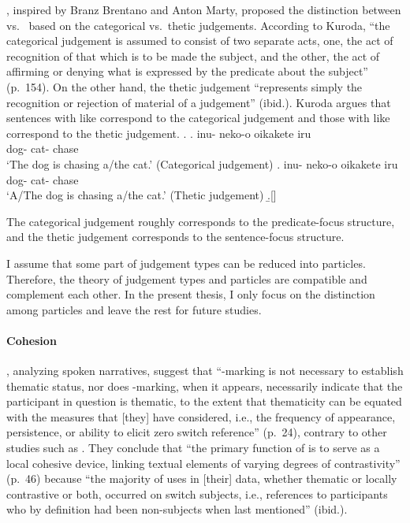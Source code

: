 ,
inspired by Branz Brentano and Anton Marty,
proposed the distinction between  vs.~
based on the categorical vs.~thetic judgements.
According to Kuroda,
``the categorical judgement is assumed to consist of two separate acts,
one, the act of recognition of that which is to be made the subject,
and the other, the act of affirming or denying what is expressed by the predicate about the subject'' (p.~154).
On the other hand,
the thetic judgement ``represents simply the recognition or rejection of material of a judgement'' (ibid.).
Kuroda argues that
sentences with  like \Next[a] correspond to the categorical judgement and
those with  like \Next[b] correspond to the thetic judgement.
%
\ex.
 \ag. inu- neko-o oikakete iru \\
      dog- cat- chase  \\
      `The dog is chasing a/the cat.'
      \hfill{(Categorical judgement)}
 \bg. inu- neko-o oikakete iru \\
      dog- cat- chase  \\
      `A/The dog is chasing a/the cat.'
      \hfill{(Thetic judgement)}
 \b.[] \hfill{\cite[p.~161]{kuroda72}}

The categorical judgement roughly corresponds to the predicate-focus structure, and
the thetic judgement corresponds to the sentence-focus structure.

I assume that some part of judgement types can be reduced into particles.
Therefore, the theory of judgement types and particles are compatible and complement each other.
In the present thesis,
I only focus on the distinction among particles
and leave the rest for future studies.

\paragraph{Cohesion}

,
analyzing spoken narratives, suggest that
``-marking is not necessary to establish thematic status, nor does -marking, when it appears, necessarily indicate that the participant in question is thematic, to the extent that
thematicity can be equated with the measures that [they] have considered,
i.e., the frequency of appearance, persistence, or ability to elicit zero switch reference'' (p.~24),
contrary to other studies such as .
They conclude that
``the primary function of  is to serve as a local cohesive device,
linking textual elements of varying degrees of contrastivity'' (p.~46)
because ``the majority of  uses in [their] data,
whether thematic or locally contrastive or both,
occurred on switch subjects,
i.e., references to participants who by definition had been non-subjects when last mentioned'' (ibid.).

